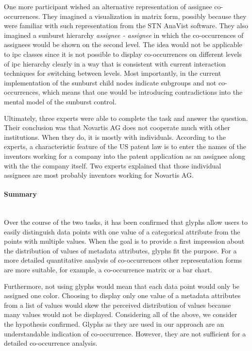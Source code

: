 One more participant wished an alternative representation of assignee co-occurrences. 
They imagined a visualization in matrix form, possibly because they were familiar with such representation from the STN AnaVist software.
They also imagined a sunburst hierarchy \textit{assignee - assignee} in which the co-occurrences of assignees would be shown on the second level.
The idea would not be applicable to \gls{ipc} classes since it is not possible to display co-occurrences on different levels of \gls{ipc} hierarchy clearly in a way that is consistent with current interaction techniques for switching between levels.
Most importantly, in the current implementation of the sunburst child nodes indicate subgroups and not co-occurrences, which means that one would be introducing contradictions into the mental model of the sunburst control.

Ultimately, three experts were able to complete the task and answer the question.
Their conclusion was that Novartis AG does not cooperate much with other institutions.
When they do, it is mostly with individuals.
According to the experts, a characteristic feature of the US patent law is to enter the names of the inventors working for a company into the patent application as an assignee along with the the company itself.
Two experts explained that those individual assignees are most probably inventors working for Novartis AG.

\paragraph{Summary}~\\
Over the course of the two tasks, it has been confirmed that glyphs allow users to easily distinguish data points with one value of a categorical attribute from the points with multiple values.
When the goal is to provide a first impression about the distribution of values of metadata attributes, glyphs fit the purpose.
For a more detailed quantitative analysis of co-occurrences other representation forms are more suitable, for example, a co-occurrence matrix or a bar chart.

Furthermore, not using glyphs would mean that each data point would only be assigned one color.
Choosing to display only one value of a metadata attributes from a list of values would skew the perceived distribution of values because many values would not be displayed.
Considering all of the above, we consider the hypothesis confirmed.
Glyphs as they are used in our approach are an understandable indication of co-occurrence.
However, they are not sufficient for a detailed co-occurrence analysis.

